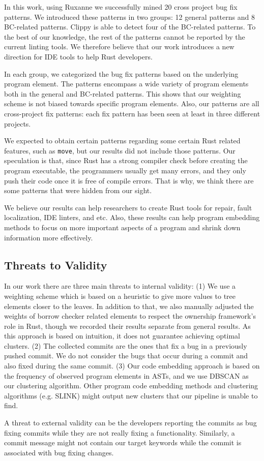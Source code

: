 In this work, using Ruxanne we successfully mined 20 cross project bug fix patterns. We introduced these patterns in two groups: 12 general patterns and 8 BC-related patterns. Clippy is able to detect four of the BC-related patterns. To the best of our knowledge, the rest of the patterns cannot be reported by the current linting tools. We therefore believe that our work introduces a new direction for IDE tools to help Rust developers.

In each group, we categorized the bug fix patterns based on the underlying program element. The patterns encompass a wide variety of program elements both in the general and BC-related patterns. This shows that our weighting scheme is not biased towards specific program elements. Also, our patterns are all cross-project fix patterns: each fix pattern has been seen at least in three different projects.

We expected to obtain certain patterns regarding some certain Rust related features, such as \verb+move+, but our results did not include those patterns. Our speculation is that, since Rust has a strong compiler check before creating the program executable, the programmers usually get many errors, and they only push their code once it is free of compile errors. That is why, we think there are some patterns that were hidden from our sight.

We believe our results can help researchers to create Rust tools for repair, fault localization, IDE linters, and etc. Also, these results can help program embedding methods to focus on more important aspects of a program and shrink down information more effectively.

\subsection{Threats to Validity}

In our work there are three main threats to internal validity: (1) We use a weighting scheme which is based on a heuristic to give more values to tree elements closer to the leaves. In addition to that, we also manually adjusted the weights of borrow checker related elements to respect the ownership framework's role in Rust, though we recorded their results separate from general results. As this approach is based on intuition, it does not guarantee achieving optimal clusters. (2) The collected commits are the ones that fix a bug in a previously pushed commit. We do not consider the bugs that occur during a commit and also fixed during the same commit. (3) Our code embedding approach is based on the frequency of observed program elements in ASTs, and we use DBSCAN as our clustering algorithm. Other program code embedding methods and clustering algorithms (e.g. SLINK) might output new clusters that our pipeline is unable to find. 

A threat to external validity can be the developers reporting the commits as bug fixing commits while they are not really fixing a functionality. Similarly, a commit message might not contain our target keywords while the commit is associated with bug fixing changes.
